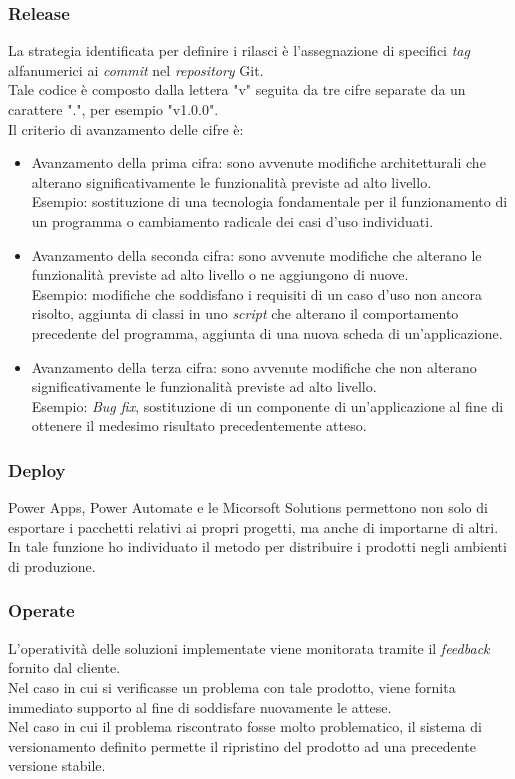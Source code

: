 \subsubsection*{Release}
La strategia identificata per definire i rilasci è l'assegnazione di specifici \emph{tag} alfanumerici ai \emph{commit} nel \emph{repository} Git.\\
Tale codice è composto dalla lettera "v" seguita da tre cifre separate da un carattere ".", per esempio "v1.0.0".\\
Il criterio di avanzamento delle cifre è: 
\begin{itemize}
    \item Avanzamento della prima cifra: sono avvenute modifiche architetturali che alterano significativamente le funzionalità previste ad alto livello.\\
    Esempio: sostituzione di una tecnologia fondamentale per il funzionamento di un programma o cambiamento radicale dei casi d'uso individuati.  
    \item Avanzamento della seconda cifra: sono avvenute modifiche che alterano le funzionalità previste ad alto livello o ne aggiungono di nuove.\\
    Esempio: modifiche che soddisfano i requisiti di un caso d'uso non ancora risolto, aggiunta di classi in uno \emph{script} che alterano il comportamento precedente del programma, aggiunta di una nuova scheda di un'applicazione.
    \item Avanzamento della terza cifra: sono avvenute modifiche che non alterano significativamente le funzionalità previste ad alto livello.\\
    Esempio: \emph{Bug fix}, sostituzione di un componente di un'applicazione al fine di ottenere il medesimo risultato precedentemente atteso. 
\end{itemize}

\subsubsection*{Deploy}
Power Apps, Power Automate e le Micorsoft Solutions permettono non solo di esportare i pacchetti relativi ai propri progetti, ma anche di importarne di altri.\\
In tale funzione ho individuato il metodo per distribuire i prodotti negli ambienti di produzione. 

\subsubsection*{Operate}
L'operatività delle soluzioni implementate viene monitorata tramite il \emph{feedback} fornito dal cliente.\\
Nel caso in cui si verificasse un problema con tale prodotto, viene fornita immediato supporto al fine di soddisfare nuovamente le attese.\\
Nel caso in cui il problema riscontrato fosse molto problematico, il sistema di versionamento definito permette il ripristino del prodotto ad una precedente versione stabile. 

